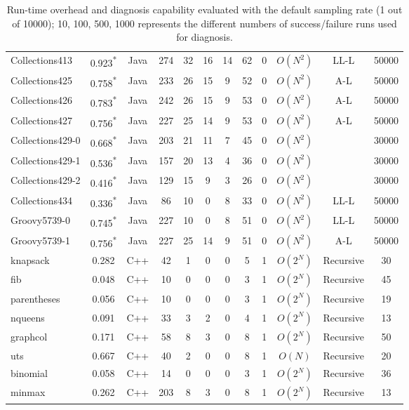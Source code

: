 \begin{table}[h!]
\begin{tabular}{lccccccccccc}
    Collections413    & 0.923\textsuperscript{*}  & Java  & 274 & 32 & 16 & 14 & 62 & 0 & $O(N^{2})$ & LL-L & 50000   \\
    Collections425    & 0.758\textsuperscript{*}  & Java  & 233 & 26 & 15 & 9  & 52 & 0 & $O(N^{2})$ & A-L & 50000    \\
    Collections426    & 0.783\textsuperscript{*}  & Java  & 242 & 26 & 15 & 9  & 53 & 0 & $O(N^{2})$ & A-L & 50000   \\
    Collections427    & 0.756\textsuperscript{*} & Java  & 227 & 25 & 14 & 9  & 53 & 0 & $O(N^{2})$ & A-L & 50000   \\
    Collections429-0    & 0.668\textsuperscript{*}  & Java  & 203 & 21 & 11 & 7 & 45 & 0 & $O(N^{2})$ & & 30000       \\
    Collections429-1    & 0.536\textsuperscript{*}  & Java  & 157 & 20 & 13 & 4 & 36 & 0 & $O(N^{2})$ & & 30000     \\
    Collections429-2    & 0.416\textsuperscript{*}  & Java  & 129 & 15 & 9 & 3  & 26 & 0 & $O(N^{2})$ & & 30000 \\
    Collections434    & 0.336\textsuperscript{*}   & Java  & 86  & 10 & 0 & 8 & 33 & 0 & $O(N^{2})$ & LL-L & 50000     \\
    \midrule
    Groovy5739-0      & 0.745\textsuperscript{*}  & Java  & 227 & 10 & 0 & 8 & 51 & 0 & $O(N^{2})$ & LL-L& 50000 \\
    Groovy5739-1      & 0.756\textsuperscript{*}  & Java  &227  & 25 &  14 & 9 & 51 & 0 & $O(N^{2})$ & A-L & 50000 \\
    \midrule
    \midrule
    knapsack      &  0.282  & C++  & 42 & 1 & 0 & 0 & 5 & 1 & $O(2^{N})$ & Recursive & 30  \\
    fib      &  0.048 & C++  & 10 & 0 & 0 & 0 & 3 & 1 & $O(2^{N})$ & Recursive & 45 \\
    parentheses      & 0.056   & C++  & 10 & 0 & 0 & 0 & 3 & 1 & $O(2^{N})$ & Recursive & 19 \\
    nqueens      & 0.091  & C++  & 33 & 3 & 2 & 0 & 4 & 1 & $O(2^{N})$ & Recursive & 13 \\
    graphcol      &  0.171  & C++  & 58 & 8 & 3 & 0 & 8 & 1 & $O(2^{N})$ & Recursive & 50 \\
    uts      &  0.667  & C++  & 40  & 2 & 0 & 0 & 8 & 1 & $O(N)$ & Recursive & 20 \\
    binomial      &  0.058  & C++  & 14 & 0 & 0 & 0 & 3 & 1 & $O(2^{N})$ & Recursive & 36 \\
    minmax      &  0.262  & C++  & 203 & 8 & 3 & 0 & 8 & 1 & $O(2^{N})$  & Recursive & 13 \\


    \bottomrule
   \end{tabular}
  \caption{Run-time overhead and diagnosis capability evaluated with the default sampling rate (1 out of 10000); 10, 100, 500, 1000 represents the different numbers of success/failure runs used for diagnosis.}
  \label{tab:LBR}
\end{table}